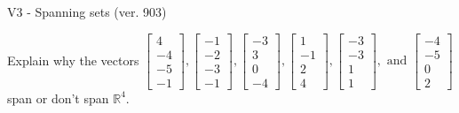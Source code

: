 \begin{exercise}
  \begin{exerciseTitle}V3 - Spanning sets (ver. 903)\end{exerciseTitle}
  \begin{exerciseStatement}
    Explain why the vectors \(\left[\begin{array}{r}
4 \\
-4 \\
-5 \\
-1
\end{array}\right] , \left[\begin{array}{r}
-1 \\
-2 \\
-3 \\
-1
\end{array}\right] , \left[\begin{array}{r}
-3 \\
3 \\
0 \\
-4
\end{array}\right] , \left[\begin{array}{r}
1 \\
-1 \\
2 \\
4
\end{array}\right] , \left[\begin{array}{r}
-3 \\
-3 \\
1 \\
1
\end{array}\right] , \text{ and } \left[\begin{array}{r}
-4 \\
-5 \\
0 \\
2
\end{array}\right]\) span or don't span \(\mathbb{R}^4\). 
	



\end{exerciseStatement}
\end{exercise}

